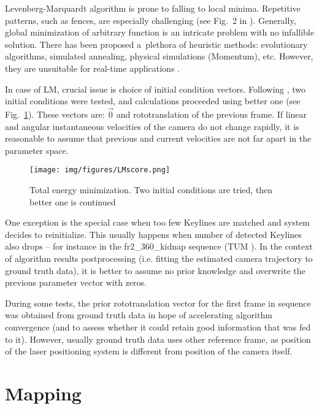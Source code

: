 Levenberg-Marquardt algorithm is prone to falling to local minima. Repetitive patterns, such as fences, are especially challenging (see Fig.~2 in \cite{parra2008robust}). Generally, global minimization of arbitrary function is an intricate problem with no infallible solution. There has been proposed a~plethora of heuristic methods: evolutionary algorithms, simulated annealing, physical simulations (Momentum), etc. However, they are unsuitable for real-time applications \cite{szeliski}.

In case of LM, crucial issue is choice of initial condition vectors. Following \cite{jose2015realtime}, two initial conditions were tested, and calculations proceeded using better one (see Fig.~\ref{fig:minim_score}). These vectors are: $\vec{0}$ and rototranslation of the previous frame. If linear and angular instantaneous velocities of the camera do not change rapidly, it is reasonable to assume that previous and current velocities are not far apart in the parameter space.

\begin{figure}[ht]
	\centering\texttt{[image: img/figures/LMscore.png]}
	\caption{ Total energy minimization. Two initial conditions are tried, then better one is continued }
	\label{fig:minim_score}
\end{figure}

One exception is the special case when too few Keylines are matched and system decides to reinitialize. This usually happens when number of detected Keylines also drops -- for instance in the fr2\_360\_kidnap sequence (TUM \cite{tum}). In the context of algorithm results postprocessing (i.e. fitting the estimated camera trajectory to ground truth data), it is better to assume no prior knowledge and overwrite the previous parameter vector with zeros.

During some tests, the prior rototranslation vector for the first frame in sequence was obtained from ground truth data in hope of accelerating algorithm convergence (and to assess whether it could retain good information that was fed to it). However, usually ground truth data uses other reference frame, as position of the laser positioning system is different from position of the camera itself.


\section{Mapping}
\label{sec:mapping}

